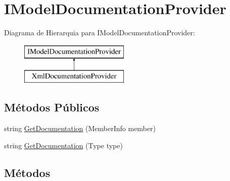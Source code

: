 \hypertarget{interfaceApi3Layers_1_1Areas_1_1HelpPage_1_1ModelDescriptions_1_1IModelDocumentationProvider}{}\section{I\+Model\+Documentation\+Provider}
\label{interfaceApi3Layers_1_1Areas_1_1HelpPage_1_1ModelDescriptions_1_1IModelDocumentationProvider}
Diagrama de Hierarquia para I\+Model\+Documentation\+Provider\+:\begin{figure}[H]
\begin{center}
\leavevmode
\includegraphics[height=2.000000cm]{interfaceApi3Layers_1_1Areas_1_1HelpPage_1_1ModelDescriptions_1_1IModelDocumentationProvider}
\end{center}
\end{figure}
\subsection*{Métodos Públicos}
\begin{DoxyCompactItemize}
\item 
string \hyperlink{interfaceApi3Layers_1_1Areas_1_1HelpPage_1_1ModelDescriptions_1_1IModelDocumentationProvider_aa774bb352a769421583abb335a1cec8a}{Get\+Documentation} (Member\+Info member)
\item 
string \hyperlink{interfaceApi3Layers_1_1Areas_1_1HelpPage_1_1ModelDescriptions_1_1IModelDocumentationProvider_af771cd863288942e506d28447daf4f82}{Get\+Documentation} (Type type)
\end{DoxyCompactItemize}


\subsection{Métodos}
\mbox{\label{interfaceApi3Layers_1_1Areas_1_1HelpPage_1_1ModelDescriptions_1_1IModelDocumentationProvider_aa774bb352a769421583abb335a1cec8a}} 
